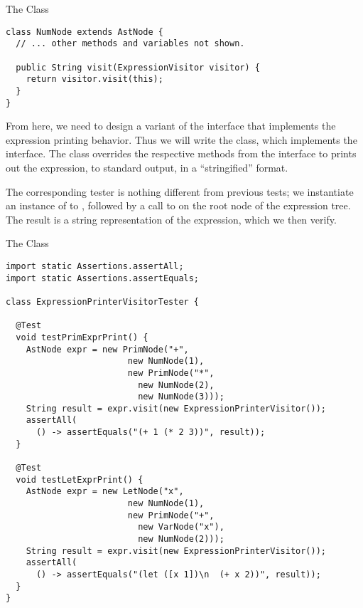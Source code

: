 \begin{cl}[]{The  Class}
\begin{lstlisting}[language=MyJava]
class NumNode extends AstNode {
  // ... other methods and variables not shown.

  public String visit(ExpressionVisitor visitor) {
    return visitor.visit(this);
  }
}
\end{lstlisting}
\end{cl}

From here, we need to design a variant of the interface that implements the expression printing behavior. Thus we will write the  class, which implements the  interface. The  class overrides the respective methods from the  interface to prints out the expression, to standard output, in a ``stringified'' format.

The corresponding tester is nothing different from previous tests; we instantiate an instance of  to , followed by a call to  on the root node of the expression tree. The result is a string representation of the expression, which we then verify.

\begin{cl}[]{The  Class}
\begin{lstlisting}[language=MyJava]
import static Assertions.assertAll;
import static Assertions.assertEquals;

class ExpressionPrinterVisitorTester {

  @Test
  void testPrimExprPrint() {
    AstNode expr = new PrimNode("+", 
                        new NumNode(1), 
                        new PrimNode("*", 
                          new NumNode(2), 
                          new NumNode(3)));
    String result = expr.visit(new ExpressionPrinterVisitor());
    assertAll(
      () -> assertEquals("(+ 1 (* 2 3))", result));
  }

  @Test
  void testLetExprPrint() {
    AstNode expr = new LetNode("x", 
                        new NumNode(1), 
                        new PrimNode("+", 
                          new VarNode("x"), 
                          new NumNode(2)));
    String result = expr.visit(new ExpressionPrinterVisitor());
    assertAll(
      () -> assertEquals("(let ([x 1])\n  (+ x 2))", result));
  }
}
\end{lstlisting}
\end{cl}


